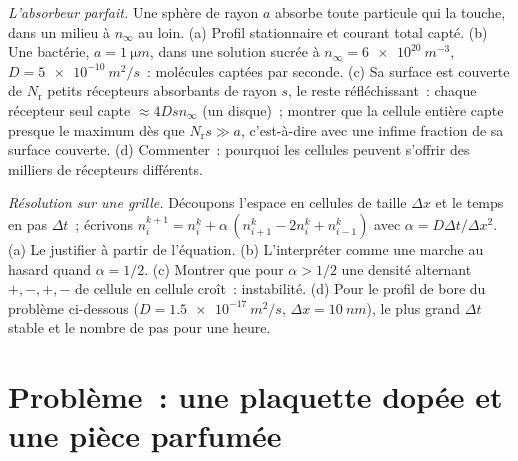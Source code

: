 \begin{exercise}[$\star\star\star$]\label{exo:b2:particle-diffusion:11}
\emph{L'absorbeur parfait.} Une sphère de rayon $a$ absorbe toute
particule qui la touche, dans un milieu à $n_\infty$ au loin. (a)
Profil stationnaire et courant total capté. (b) Une bactérie, $a =
\qty{1}{\micro m}$, dans une solution sucrée à $n_\infty = \qty{6e20}{m^{-3}}$,
$D = \qty{5e-10}{m^2/s}$~: molécules captées par seconde. (c) Sa
surface est couverte de $N_{\text{r}}$ petits récepteurs absorbants de
rayon $s$, le reste réfléchissant~: chaque récepteur seul capte $\approx
4Ds n_\infty$ (un disque)~; montrer que la cellule entière capte presque le
maximum dès que $N_{\text{r}} s \gg a$, c'est-à-dire avec une infime fraction de sa
surface couverte. (d) Commenter~: pourquoi les cellules peuvent s'offrir des milliers de
récepteurs différents.
\end{exercise}

\begin{exercise}[$\star\star\star$]\label{exo:b2:particle-diffusion:12}
\emph{Résolution sur une grille.} Découpons l'espace en cellules de taille $\Delta x$
et le temps en pas $\Delta t$~; écrivons $n_i^{k+1} = n_i^k + \alpha\,(n_{i+1}^k
- 2n_i^k + n_{i-1}^k)$ avec $\alpha = D\Delta t/\Delta x^2$. (a) Le justifier
à partir de l'équation. (b) L'interpréter comme une marche au hasard quand $\alpha =
1/2$. (c) Montrer que pour $\alpha > 1/2$ une densité alternant $+,-,+,-$
de cellule en cellule croît~: instabilité. (d) Pour le profil de bore du
problème ci-dessous ($D = \qty{1.5e-17}{m^2/s}$, $\Delta x = \qty{10}{nm}$),
le plus grand $\Delta t$ stable et le nombre de pas pour une heure.
\end{exercise}

\section{Problème~: une plaquette dopée et une pièce parfumée}

